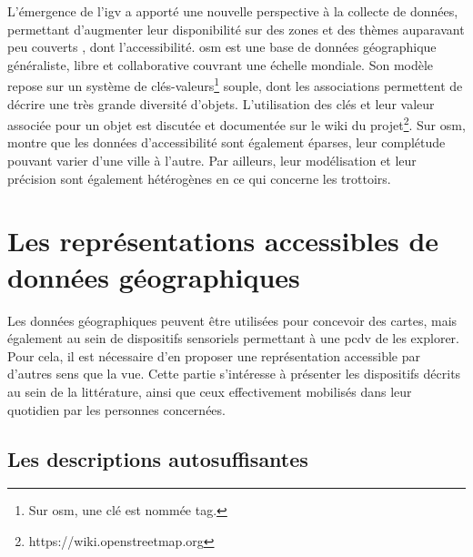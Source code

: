 
\newpage

L'émergence de l'\gls{igv} a apporté une nouvelle perspective à la collecte de données, permettant d'augmenter leur disponibilité sur des zones et des thèmes auparavant peu couverts \citep{Goodchild2007}, dont l'accessibilité. \gls{osm} est une base de données géographique généraliste, libre et collaborative couvrant une échelle mondiale. Son modèle repose sur un système de clés-valeurs\footnote{Sur \gls{osm}, une clé est nommée tag.} souple, dont les associations permettent de décrire une très grande diversité d'objets. L'utilisation des clés et leur valeur associée pour un objet est discutée et documentée \citep{Ballatore2015} sur le wiki du projet\footnote{https://wiki.openstreetmap.org}. Sur \gls{osm}, \citet{Mobasheri2017} montre que les données d'accessibilité sont également éparses, leur complétude pouvant varier d'une ville à l'autre. Par ailleurs, leur modélisation et leur précision sont également hétérogènes \citep{Biagi2020} en ce qui concerne les trottoirs.


\section{Les représentations accessibles de données géographiques}


Les données géographiques peuvent être utilisées pour concevoir des cartes, mais également au sein de dispositifs sensoriels permettant à une \gls{pcdv} de les explorer. Pour cela, il est nécessaire d'en proposer une représentation accessible par d'autres sens que la vue. Cette partie s'intéresse à présenter les dispositifs décrits au sein de la littérature, ainsi que ceux effectivement mobilisés dans leur quotidien par les personnes concernées.

\subsection{Les descriptions autosuffisantes}

\label{ea_description_autosuffisante}

